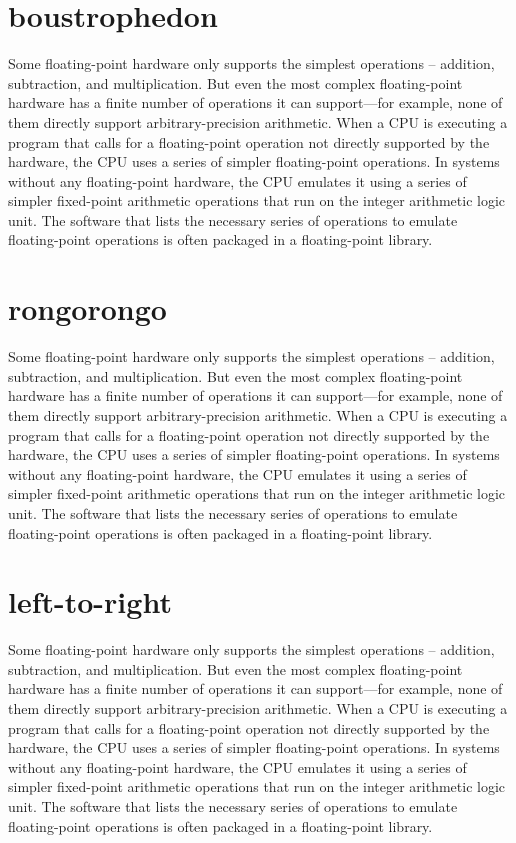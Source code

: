 \documentclass{article}
\begin{document}
\section*{boustrophedon}
\begin{boustrophedon}
Some floating-point hardware only supports the simplest operations -- addition, subtraction, and multiplication. But even the most complex floating-point hardware has a finite number of operations it can support—for example, none of them directly support arbitrary-precision arithmetic. When a CPU is executing a program that calls for a floating-point operation not directly supported by the hardware, the CPU uses a series of simpler floating-point operations. In systems without any floating-point hardware, the CPU emulates it using a series of simpler fixed-point arithmetic operations that run on the integer arithmetic logic unit. The software that lists the necessary series of operations to emulate floating-point operations is often packaged in a floating-point library.
\end{boustrophedon}

\section*{rongorongo}
\begin{rongorongo}
Some floating-point hardware only supports the simplest operations -- addition, subtraction, and multiplication. But even the most complex floating-point hardware has a finite number of operations it can support—for example, none of them directly support arbitrary-precision arithmetic. When a CPU is executing a program that calls for a floating-point operation not directly supported by the hardware, the CPU uses a series of simpler floating-point operations. In systems without any floating-point hardware, the CPU emulates it using a series of simpler fixed-point arithmetic operations that run on the integer arithmetic logic unit. The software that lists the necessary series of operations to emulate floating-point operations is often packaged in a floating-point library.
\end{rongorongo}

\section*{left-to-right}
Some floating-point hardware only supports the simplest operations -- addition, subtraction, and multiplication. But even the most complex floating-point hardware has a finite number of operations it can support—for example, none of them directly support arbitrary-precision arithmetic. When a CPU is executing a program that calls for a floating-point operation not directly supported by the hardware, the CPU uses a series of simpler floating-point operations. In systems without any floating-point hardware, the CPU emulates it using a series of simpler fixed-point arithmetic operations that run on the integer arithmetic logic unit. The software that lists the necessary series of operations to emulate floating-point operations is often packaged in a floating-point library.
\end{document}
